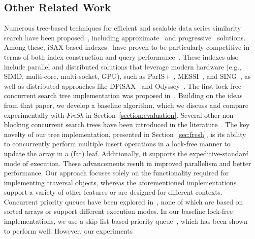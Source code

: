 \documentclass[a4paper,11pt,twoside,openany]{book}
\begin{document}
\subsection{Other Related Work}
Numerous tree-based techniques for efficient and scalable data series similarity search
have been proposed~\cite{DBLP:journals/pvldb/EchihabiZPB18, DBLP:journals/pvldb/EchihabiZPB19,
DBLP:conf/edbt/EchihabiZP21, DBLP:journals/pvldb/EchihabiPZ21},
including approximate~\cite{DBLP:journals/pvldb/AziziEP23, 
DBLP:journals/kais/LevchenkoKYAMPS21} and 
progressive~\cite{DBLP:conf/sigmod/GogolouTEBP20, DBLP:journals/tvcg/JoSF20,
DBLP:conf/sigmod/LiZAH20, DBLP:journals/vldb/EchihabiTGBP23} solutions.
Among these, iSAX-based indexes~\cite{isaxfamily} have proven to be particularly
competitive in terms of both index construction and query performance~\cite{DBLP:journals/pvldb/EchihabiZPB18,
DBLP:journals/pvldb/EchihabiZPB19, hercules, odyssey, dumpy}. These indexes also include
parallel and distributed solutions that leverage modern hardware (e.g., SIMD, multi-core,
multi-socket, GPU), such as ParIS+~\cite{parisplus}, MESSI~\cite{PFP21-I}, and SING~\cite{PFP21-II},
as well as distributed approaches like DPiSAX~\cite{dpisax, dpisaxjournal} and
Odyssey~\cite{odyssey}.
% 
The first lock-free concurrent search tree implementation was proposed in~\cite{EFRB10}.
Building on the ideas from that paper, we develop a baseline algorithm, which we discuss
and compare experimentally with \textit{FreSh} in Section~\ref{section:evaluation}.
Several other non-blocking concurrent search trees have been introduced in the 
literature~\cite{BER14, HL16, ABF20, HJ12, NRM20, CNT14, BP12, EFHR14, FR2018, ABF+22}.
The key novelty of our tree implementation, presented in Section~\ref{sec:fresh}, is its
ability to concurrently perform multiple insert operations in a lock-free manner to
update the array in a (fat) leaf. Additionally, it supports the expeditive-standard mode
of execution. These advancements result in improved parallelism and better performance.
Our approach focuses solely on the functionality required for implementing traversal objects,
whereas the aforementioned implementations support a variety of other features or are designed
for different contexts.
% 
Concurrent priority queues have been explored in~\cite{AK15-I, RT21, WG15, SUNDELL2005609,
tamir_et_al, LJ13}, none of which are based on sorted arrays or support different
execution modes. In our baseline lock-free implementations, we use a skip-list-based
priority queue~\cite{LJ13}, which has been shown to perform well. However, our experiments
\end{document}
